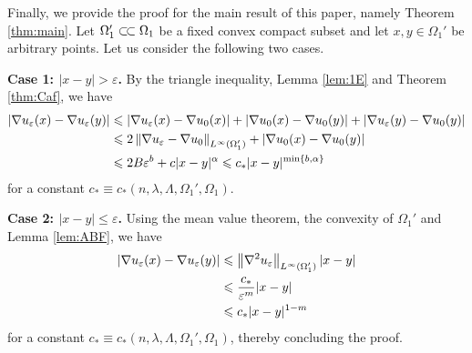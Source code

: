 \documentclass[reqno,12pt]{article}
\newcommand{\norm}[1]{\left\lVert#1\right\rVert}
\newcommand{\ssubset}{\subset\joinrel\subset}
\begin{document}
Finally, we provide the proof for the main result of this paper, namely Theorem \ref{thm:main}. Let $\Omega_{1}'\ssubset \Omega_{1}$ be a fixed convex compact subset and let $x,y\in \Omega_{1}'$ be arbitrary points. Let us consider the following two cases.\vspace{2mm}

\noindent
\textbf{Case 1: $|x-y|>\varepsilon$.} By the triangle inequality, Lemma \ref{lem:1E}
 and Theorem \ref{thm:Caf}, we have
\begin{align*}
    |\nabla u_{\varepsilon}(x)-\nabla u_{\varepsilon}(y)| 
    &\leqslant
    |\nabla u_{\varepsilon}(x)-\nabla u_{0}(x)| + |\nabla u_{0}(x)-\nabla u_{0}(y)| + |\nabla u_{\varepsilon}(y)-\nabla u_{0}(y)|
    \notag\\&
    \leqslant
    2\norm{\nabla u_{\varepsilon}-\nabla u_{0}}_{L^{\infty}(\Omega_{1}')} + |\nabla u_{0}(x)-\nabla u_{0}(y)|
    \notag\\&
    \leqslant
    2B\varepsilon^{b} + c|x-y|^{\alpha}
    \leqslant
    c_{*}|x-y|^{\min\{b,\alpha\}}
\end{align*}
for a constant $c_{*}\equiv c_{*}(n,\lambda,\Lambda,\Omega_{1}', \Omega_{1})$.\vspace{2mm}

\noindent
\textbf{Case 2: $|x-y|\leqslant \varepsilon$.} Using the mean value theorem, the convexity of $\Omega_{1}'$ and Lemma \ref{lem:ABF}, we have
\begin{align*}
    |\nabla u_{\varepsilon}(x)-\nabla u_{\varepsilon}(y)| 
    &\leqslant
    \norm{\nabla^2u_{\varepsilon}}_{L^{\infty}(\Omega_{1}')}|x-y|
    \notag\\&
    \leqslant
    \frac{c_{*}}{\varepsilon^{m}}|x-y|
    \notag\\&
    \leqslant
    c_{*}|x-y|^{1-m}
\end{align*}
for a constant $c_{*}\equiv c_{*}(n,\lambda,\Lambda,\Omega_{1}', \Omega_{1})$, thereby concluding the proof.
\end{document}
